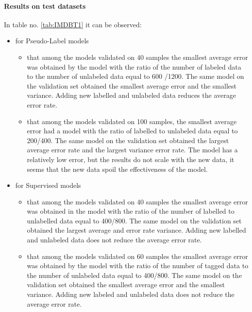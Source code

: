 \documentclass[12pt]{article}
\theoremstyle{definition}
\DeclareRobustCommand{\[}{\begin{equation}}
\DeclareRobustCommand{\]}{\end{equation}}
\begin{document}
\paragraph{Results on test datasets}
In table no. \ref{tab:IMDBT1} it can be observed:
\begin{itemize}
    \item for Pseudo-Label models
    \begin{itemize}
        \item that among the models validated on 40 samples the smallest average error was obtained by the model with the ratio of the number of labeled data to the number of unlabeled data equal to 600 /1200. The same model on the validation set obtained the smallest average error and the smallest variance. Adding new labelled and unlabeled data reduces the average error rate. 
        
        \item that among the models validated on 100 samples, the smallest average error had a model with the ratio of labelled to unlabeled data equal to 200/400. The same model on the validation set obtained the largest average error rate and the largest variance error rate. The model has a relatively low error, but the results do not scale with the new data, it seems that the new data spoil the effectiveness of the model.
        
    \end{itemize}
    \item for Supervised models
    \begin{itemize}
        \item that among the models validated on 40 samples the smallest average error was obtained in the model with the ratio of the number of labelled to unlabelled data equal to 400/800. The same model on the validation set obtained the largest average and error rate variance. Adding new labelled and unlabeled data does not reduce the average error rate. 
        
        \item that among the models validated on 60 samples the smallest average error was obtained by the model with the ratio of the number of tagged data to the number of unlabeled data equal to 400/800. The same model on the validation set obtained the smallest average error and the smallest variance. Adding new labeled and unlabeled data does not reduce the average error rate. 
    \end{itemize}
\end{itemize}
\end{document}
